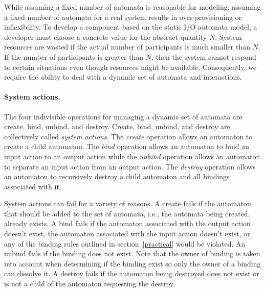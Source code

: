 While assuming a fixed number of automata is reasonable for modeling, assuming a fixed number of automata for a real system results in over-provisioning or inflexibility.
To develop a component based on the static I/O automata model, a developer must choose a concrete value for the abstract quantity $N$.
System resources are wasted if the actual number of participants is much smaller than $N$.
If the number of participants is greater than $N$, then the system cannot respond to certain situations even though resources might be available.
Consequently, we require the ability to deal with a dynamic set of automata and interactions.

\paragraph{System actions.}
The four indivisible operations for managing a dynamic set of automata are create, bind, unbind, and destroy.
Create, bind, unbind, and destroy are collectively called \emph{system actions}.
The \emph{create} operation allows an automaton to create a child automaton.
The \emph{bind} operation allows an automaton to bind an input action to an output action while the \emph{unbind} operation allows an automaton to separate an input action from an output action.
The \emph{destroy} operation allows an automaton to recursively destroy a child automaton and all bindings associated with it.

System actions can fail for a variety of reasons.
A create fails if the automaton that should be added to the set of automata, i.e., the automata being created, already exists.
A bind fails if the automaton associated with the output action doesn't exist, the automaton associated with the input action doesn't exist, or any of the binding rules outlined in section~\ref{practical} would be violated.
An unbind fails if the binding does not exist.
Note that the owner of binding is taken into account when determining if the binding exist so only the owner of a binding can dissolve it.
A destroy fails if the automaton being destroyed does not exist or is not a child of the automaton requesting the destroy.

